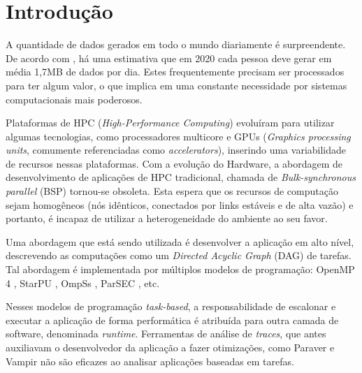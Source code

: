 \documentclass[ppgc,espec]{iiufrgs}
\begin{document}

\listoffigures

\listoftables

\tableofcontents


\chapter{Introdução} \label{intro}

A quantidade de dados gerados em todo o mundo diariamente é surpreendente. De acordo com \citet{ref:data_minute2}, há uma estimativa
que em 2020 cada pessoa deve gerar em média 1,7MB de dados por dia. Estes frequentemente precisam ser processados para ter algum valor,
o que implica em uma constante necessidade por sistemas computacionais mais poderosos.

Plataformas de HPC (\emph{High-Performance Computing}) evoluíram para utilizar algumas tecnologias, como processadores multicore e GPUs (\emph{Graphics processing units}, comumente referenciadas como \emph{accelerators}), inserindo uma variabilidade de recursos nessas plataformas. Com a evolução do Hardware, a abordagem de desenvolvimento de aplicações de HPC tradicional, chamada de \emph{Bulk-synchronous parallel} (BSP) tornou-se obsoleta. Esta espera que os recursos de computação sejam homogêneos (nós idênticos, conectados por links estáveis e de alta vazão) e portanto, é incapaz de utilizar a heterogeneidade do ambiente ao seu favor. 

Uma abordagem que está sendo utilizada é desenvolver a aplicação em alto nível, descrevendo as computações como um \emph{Directed Acyclic Graph} (DAG) de tarefas. Tal abordagem é implementada por múltiplos modelos de programação: OpenMP 4 \cite{ref:openmp4}, StarPU \cite{ref:starpu}, OmpSs \cite{ref:ompss}, ParSEC \cite{ref:parsec}, etc. 

Nesses modelos de programação \emph{task-based}, a responsabilidade de escalonar e executar a aplicação de forma performática é atribuída para outra camada de software, denominada \emph{runtime}. Ferramentas de análise de \emph{traces}, que antes auxiliavam o desenvolvedor da aplicação a fazer otimizações, como Paraver \cite{ref:paraver} e Vampir \cite{ref:vampir} não são eficazes ao analisar aplicações baseadas em tarefas.
\end{document}
